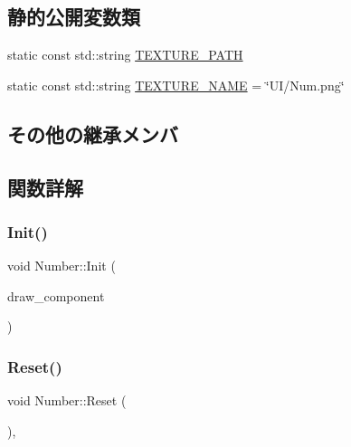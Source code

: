 \subsection*{静的公開変数類}
\begin{DoxyCompactItemize}
\item 
static const std\+::string \mbox{\hyperlink{class_number_a0018ed63d70f4dde3c64bf99df7978ce}{T\+E\+X\+T\+U\+R\+E\+\_\+\+P\+A\+TH}}
\item 
static const std\+::string \mbox{\hyperlink{class_number_a43c6583cef6d8d32b8de6683f80bdb59}{T\+E\+X\+T\+U\+R\+E\+\_\+\+N\+A\+ME}} = \char`\"{}UI/Num.\+png\char`\"{}
\end{DoxyCompactItemize}
\subsection*{その他の継承メンバ}


\subsection{関数詳解}
\mbox{\label{class_number_a5830270854ab224b60462f50f495a1fa}} 
\subsubsection{\texorpdfstring{Init()}{Init()}}
{\footnotesize\ttfamily void Number\+::\+Init (\begin{DoxyParamCaption}\item[{\mbox{\hyperlink{class_draw_component}{Draw\+Component}} $\ast$}]{draw\+\_\+component }\end{DoxyParamCaption})}

\mbox{\label{class_number_a7c6facdb1b3d0acc8309e0a915863d44}} 
\subsubsection{\texorpdfstring{Reset()}{Reset()}}
{\footnotesize\ttfamily void Number\+::\+Reset (\begin{DoxyParamCaption}{ }\end{DoxyParamCaption})\hspace{0.3cm}{\ttfamily [override]}, {\ttfamily [virtual]}}



